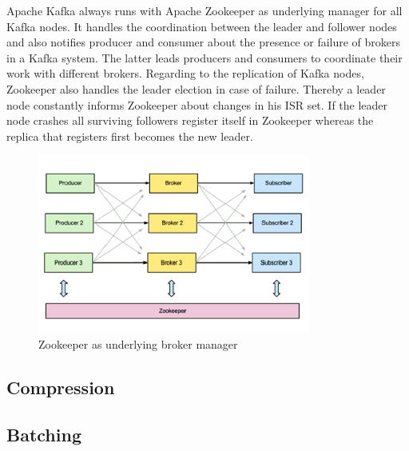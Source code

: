Apache Kafka always runs with Apache Zookeeper  as underlying manager for all
Kafka nodes. It handles the coordination between the leader and follower nodes
and also notifies producer and consumer about the presence or failure of brokers in a
Kafka system. The latter leads producers and consumers to coordinate their work
with different brokers. Regarding to the replication of Kafka nodes, Zookeeper
also handles the leader election in case of failure. Thereby a leader node
constantly informs Zookeeper about changes in his ISR set. If the leader node
crashes all surviving followers register itself in Zookeeper whereas
the replica that registers first becomes the new leader.
\cite{kafka-wiki-replication} \cite{ArtKafkaInfoQ}

\begin{figure}[H]
    \centering
    \includegraphics[width=0.8\textwidth]{images/kafka-replication-zookeeper.png}
    \caption{Zookeeper as underlying broker manager \cite{ArtKafkaInfoQ}}
    \label{fig:the-log}
\end{figure}

\subsection{Compression}

\subsection{Batching}
\label{intro-kafka-components-batching}



